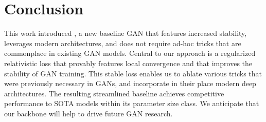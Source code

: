 \vspace{-0.2cm}
\section{Conclusion}
\vspace{-0.2cm}

This work introduced \modelName, a new baseline GAN that features increased stability, leverages modern architectures, and does not require ad-hoc tricks that are commonplace in existing GAN models.
Central to our approach is a regularized relativistic loss that provably features local convergence and that improves the stability of GAN training. This stable loss enables us to ablate various tricks that were previously necessary in GANs, and incorporate in their place modern deep architectures. The resulting streamlined baseline achieves competitive performance to SOTA models within its parameter size class. We anticipate that our backbone will help to drive future GAN research.



